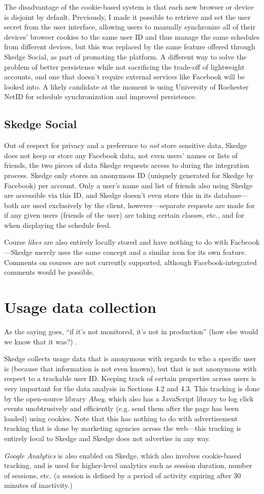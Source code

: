 The disadvantage of the cookie-based system is that each new browser or device is disjoint by default. Previously, I made it possible to retrieve and set the user secret from the user interface, allowing users to manually synchronize all of their devices' browser cookies to the same user ID and thus manage the same schedules from different devices, but this was replaced by the same feature offered through Skedge Social, as part of promoting the platform. A different way to solve the problem of better persistence while not sacrificing the trade-off of lightweight accounts, and one that doesn't require external services like Facebook will be looked into. A likely candidate at the moment is using University of Rochester NetID for schedule synchronization and improved persistence.

\subsection{Skedge Social}

Out of respect for privacy and a preference to \emph{not} store sensitive data, Skedge does not keep or store any Facebook data, not even users' names or lists of friends, the two pieces of data Skedge requests access to during the integration process. Skedge only stores an anonymous ID (uniquely generated for Skedge by Facebook) per account. Only a user’s name and list of friends also using Skedge are accessible via this ID, and Skedge doesn’t even store this in its database---both are used exclusively by the client, however---separate requests are made for if any given users (friends of the user) are taking certain classes, etc., and for when displaying the schedule feed.

Course \emph{likes} are also entirely locally stored and have nothing to do with Facbeook---Skedge merely uses the same concept and a similar icon for its own feature. Comments on courses are not currently supported, although Facebook-integrated comments would be possible.

\section{Usage data collection}

As the saying goes, ``if it's not monitored, it's not in production'' (how else would we know that it was?) \cite{monitored}.

Skedge collects usage data that is anonymous with regards to who a specific user is (because that information is not even known), but that is not anonymous with respect to a trackable user ID. Keeping track of certain properties across users is very important for the data analysis in Sections 4.2 and 4.3. This tracking is done by the open-source library \emph{Ahoy}, which also has a JavaScript library to log click events unobtrusively and efficiently (e.g. send them after the page has been loaded) using cookies. Note that this has nothing to do with advertisement tracking that is done by marketing agencies across the web---this tracking is entirely local to Skedge and Skedge does not advertise in any way.

\emph{Google Analytics} is also enabled on Skedge, which also involves cookie-based tracking, and is used for higher-level analytics such as session duration, number of sessions, etc. (a session is defined by a period of activity expiring after 30 minutes of inactivity.)